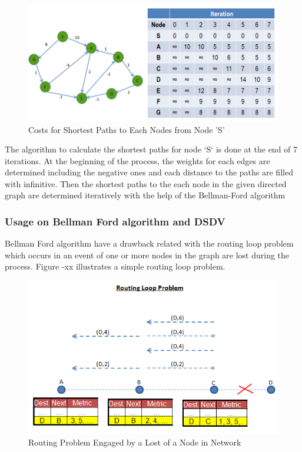 \begin{figure}[H]
\caption{Costs for Shortest Paths to Each Nodes from Node 'S'}
\centering
\includegraphics[scale = 0.65]{bellman}
\end{figure}

The algorithm to calculate the shortest paths for node `S` is done at the end of 7 iterations. At the beginning of the process, the weights for each edges are determined including the negative ones and each distance to the paths are filled with infinitive. Then the shortest paths to the each node in the given directed graph are determined iteratively with the help of the Bellman-Ford algorithm

\subsubsection{Usage on Bellman Ford algorithm and DSDV}
Bellman Ford algorithm have a drawback related with the routing loop problem which occurs in an event of one or more nodes in the graph are lost during the process. Figure -xx illustrates a simple routing loop problem.

\begin{figure}[H]
\caption{Routing Problem Engaged by a Lost of a Node in Network}
\centering
\includegraphics[scale = 0.65]{routing_problem}
\end{figure}

